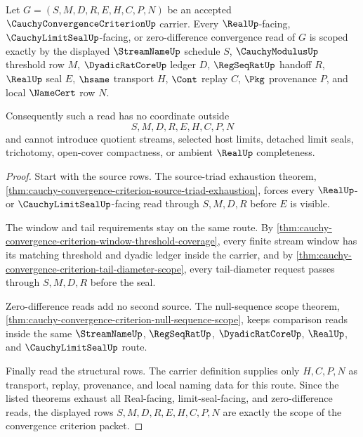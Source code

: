 \begin{theorem}\label{thm:cauchy-convergence-criterion-scoped-closure}
Let $G=(S,M,D,R,E,H,C,P,N)$ be an accepted $\CauchyConvergenceCriterionUp$ carrier. Every $\RealUp$-facing, $\CauchyLimitSealUp$-facing, or zero-difference convergence read of $G$ is scoped exactly by the displayed $\StreamNameUp$ schedule $S$, $\CauchyModulusUp$ threshold row $M$, $\DyadicRatCoreUp$ ledger $D$, $\RegSeqRatUp$ handoff $R$, $\RealUp$ seal $E$, $\hsame$ transport $H$, $\Cont$ replay $C$, $\Pkg$ provenance $P$, and local $\NameCert$ row $N$.

Consequently such a read has no coordinate outside
$$
S,M,D,R,E,H,C,P,N
$$
and cannot introduce quotient streams, selected host limits, detached limit seals, trichotomy, open-cover compactness, or ambient $\RealUp$ completeness.
\end{theorem}
\begin{proof}
Start with the source rows. The source-triad exhaustion theorem, \autoref{thm:cauchy-convergence-criterion-source-triad-exhaustion}, forces every $\RealUp$- or $\CauchyLimitSealUp$-facing read through $S,M,D,R$ before $E$ is visible.

The window and tail requirements stay on the same route. By \autoref{thm:cauchy-convergence-criterion-window-threshold-coverage}, every finite stream window has its matching threshold and dyadic ledger inside the carrier, and by \autoref{thm:cauchy-convergence-criterion-tail-diameter-scope}, every tail-diameter request passes through $S,M,D,R$ before the seal.

Zero-difference reads add no second source. The null-sequence scope theorem, \autoref{thm:cauchy-convergence-criterion-null-sequence-scope}, keeps comparison reads inside the same $\StreamNameUp$, $\RegSeqRatUp$, $\DyadicRatCoreUp$, $\RealUp$, and $\CauchyLimitSealUp$ route.

Finally read the structural rows. The carrier definition supplies only $H,C,P,N$ as transport, replay, provenance, and local naming data for this route. Since the listed theorems exhaust all Real-facing, limit-seal-facing, and zero-difference reads, the displayed rows $S,M,D,R,E,H,C,P,N$ are exactly the scope of the convergence criterion packet.
\end{proof}

